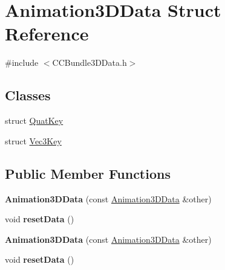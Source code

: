\hypertarget{structAnimation3DData}{}\section{Animation3\+D\+Data Struct Reference}
\label{structAnimation3DData}


{\ttfamily \#include $<$C\+C\+Bundle3\+D\+Data.\+h$>$}

\subsection*{Classes}
\begin{DoxyCompactItemize}
\item 
struct \hyperlink{structAnimation3DData_1_1QuatKey}{Quat\+Key}
\item 
struct \hyperlink{structAnimation3DData_1_1Vec3Key}{Vec3\+Key}
\end{DoxyCompactItemize}
\subsection*{Public Member Functions}
\begin{DoxyCompactItemize}
\item 
\mbox{\label{structAnimation3DData_a08a50f1872779d82983a87034242d571}} 
{\bfseries Animation3\+D\+Data} (const \hyperlink{structAnimation3DData}{Animation3\+D\+Data} \&other)
\item 
\mbox{\label{structAnimation3DData_a5881b37c9845ffc613dbca3a3504f420}} 
void {\bfseries reset\+Data} ()
\item 
\mbox{\label{structAnimation3DData_a08a50f1872779d82983a87034242d571}} 
{\bfseries Animation3\+D\+Data} (const \hyperlink{structAnimation3DData}{Animation3\+D\+Data} \&other)
\item 
\mbox{\label{structAnimation3DData_a5881b37c9845ffc613dbca3a3504f420}} 
void {\bfseries reset\+Data} ()
\end{DoxyCompactItemize}
